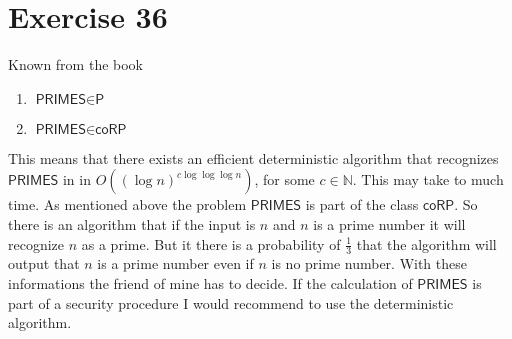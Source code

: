 \documentclass[10pt]{article}
\newcommand{\PRIMES}{\textsf{PRIMES}}
\newcommand{\cP}{\textsf{P}}
\newcommand{\coRP}{\textsf{coRP}}
\begin{document}
\section*{Exercise 36}
Known from the book
\begin{enumerate}
  \item $\PRIMES \in \cP$
  \item $\PRIMES \in \coRP$
\end{enumerate}
This means that there exists an efficient deterministic algorithm that recognizes $\PRIMES$ in
in $O((\log n)^{c \log \log \log n})$, for some $c\in \mathbb{N}$. This may take to much time. As mentioned
above the problem $\PRIMES$ is part of the class $\coRP$. So there is an
algorithm that if the input is $n$ and $n$ is a prime number it will recognize
$n$ as a prime. But it there is a probability of $\frac{1}{3}$ that the algorithm will output
that $n$ is a prime number even if $n$ is no prime number. With these
informations the friend of mine has to decide. If the calculation of $\PRIMES$
is part of a security procedure I would recommend to use the deterministic
algorithm. 
\end{document}
